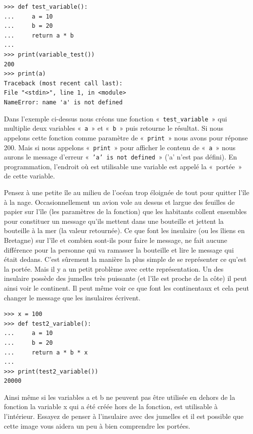 \begin{Verbatim}[frame=single,rulecolor=\color{red}, label=erreur]
>>> def test_variable():
...     a = 10
...     b = 20
...     return a * b
...
>>> print(variable_test())
200
>>> print(a)
Traceback (most recent call last):
File "<stdin>", line 1, in <module>
NameError: name 'a' is not defined
\end{Verbatim}

Dans l'exemple ci-dessus nous créons une fonction «~\texttt{test\_variable}~» qui multiplie deux variables «~\texttt{a}~» et «~\texttt{b}~» puis retourne le résultat. Si nous appelons cette fonction comme paramètre de «~\texttt{print}~»  nous avons pour réponse 200. Mais si nous appelons «~\texttt{print}~» pour afficher le contenu de «~\texttt{a}~» nous aurons  le message d'erreur «~\texttt{'a' is not defined}~» ('a' n'est pas défini). En programmation, l'endroit où est utilisable une variable est appelé la «~portée~» de cette variable.

Pensez à une petite île au milieu de l'océan trop éloignée de tout pour quitter l'île à la nage. Occasionnellement un avion vole au dessus et largue des feuilles de papier sur l'île (les paramètres de la fonction) que les habitants collent ensembles pour constituer un message qu'ils mettent dans une bouteille et jettent la bouteille à la mer (la valeur retournée). Ce que font les insulaire (ou les îliens en Bretagne) sur l'île et combien sont-ils pour faire le message, ne fait aucune différence pour la personne qui va ramasser la bouteille et lire le message qui était dedans. C'est sûrement la manière la plus simple de se représenter ce qu'est la portée. Mais il y a un petit problème avec cette représentation. Un des insulaire possède des jumelles très puissante (et l'île est proche de la côte) il peut ainsi voir le continent. Il peut même voir ce que font les continentaux et cela peut changer le message que les insulaires écrivent.

 \begin{Verbatim}[frame=single,rulecolor=\color{mbleu}, label=à taper]
>>> x = 100
>>> def test2_variable():
...     a = 10
...     b = 20
...     return a * b * x
...
>>> print(test2_variable())
20000
\end{Verbatim}

Ainsi même si les variables a et b ne peuvent pas être utilisée en dehors de la fonction la variable x qui a été créée hors de la fonction, est utilisable à l'intérieur. Essayez de penser à l'insulaire avec des jumelles et il est possible que cette image vous aidera un peu à bien comprendre les portées. 

